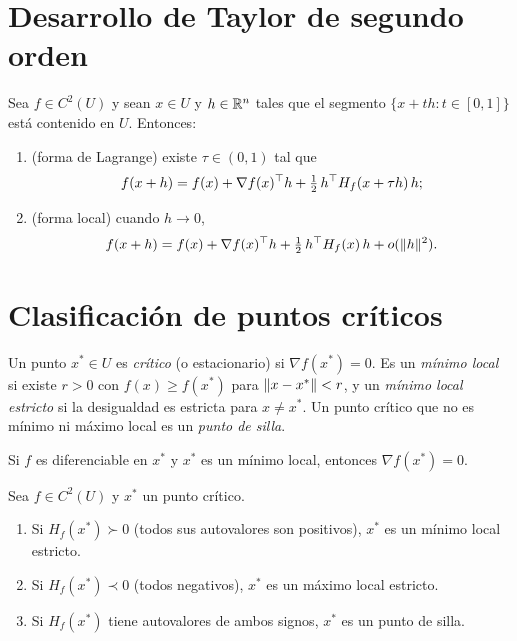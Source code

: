 \section{Desarrollo de Taylor de segundo orden}

\begin{teorema}\label{teo:taylor}
Sea $f\in C^{2}(U)$ y sean $x\in U$ y $h\in\mathbb{R}^{n}$ tales que el segmento $\{x+th:t\in[0,1]\}$ está contenido en $U$. Entonces:
\begin{enumerate}
  \item (forma de Lagrange) existe $\tau\in(0,1)$ tal que
  \[
  f(x+h)=f(x)+\nabla f(x)^{\top} h+\tfrac12\,h^{\top} H_f(x+\tau h)\,h;
  \]
  \item (forma local) cuando $h\to 0$,
  \[
  f(x+h)=f(x)+\nabla f(x)^{\top} h+\tfrac12\,h^{\top} H_f(x)\,h+o(\lVert h\rVert^{2}).
  \]
\end{enumerate}
\end{teorema}

\addtocounter{definicion}{1}%

\section{Clasificación de puntos críticos}

\begin{definicion}
Un punto $x^{*}\in U$ es \emph{crítico} (o estacionario) si $\nabla f(x^{*})=0$. Es un \emph{mínimo local} si existe $r>0$ con $f(x)\ge f(x^{*})$ para $\lVert x-x^{*}\rVert<r$, y un \emph{mínimo local estricto} si la desigualdad es estricta para $x\ne x^{*}$. Un punto crítico que no es mínimo ni máximo local es un \emph{punto de silla}.
\end{definicion}

\begin{teorema}\label{teo:fermat}
Si $f$ es diferenciable en $x^{*}$ y $x^{*}$ es un mínimo local, entonces $\nabla f(x^{*})=0$.
\end{teorema}

\begin{teorema}\label{teo:criterio}
Sea $f\in C^{2}(U)$ y $x^{*}$ un punto crítico.
\begin{enumerate}
  \item Si $H_f(x^{*})\succ 0$ (todos sus autovalores son positivos), $x^{*}$ es un mínimo local estricto.
  \item Si $H_f(x^{*})\prec 0$ (todos negativos), $x^{*}$ es un máximo local estricto.
  \item Si $H_f(x^{*})$ tiene autovalores de ambos signos, $x^{*}$ es un punto de silla.
\end{enumerate}
\end{teorema}

